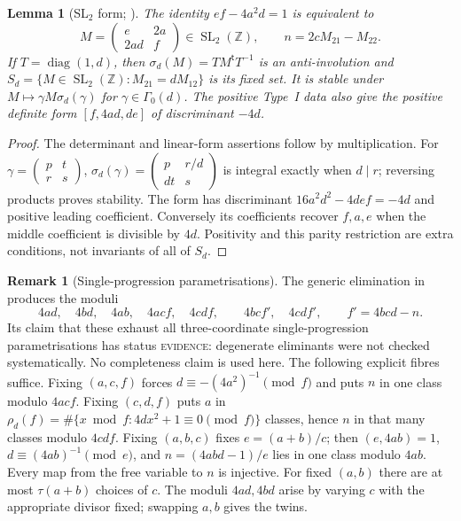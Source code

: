 \documentclass[10pt,reqno]{amsart}
\newtheorem{lemma}[theorem]{Lemma}
\theoremstyle{definition}
\newtheorem{remark}[theorem]{Remark}
\numberwithin{equation}{section}
\newcommand{\Z}{\mathbb Z}
\DeclareMathOperator{\SL}{SL}
\newcommand{\status}[1]{\textup{\textsc{#1}}}
\begin{document}
\begin{lemma}[SL$_2$ form; {\cite[Lemma~3.1]{MN3}}]\label{M:3.1}
The identity $ef-4a^2d=1$ is equivalent to
\[
 M=\begin{pmatrix}e&2a\\2ad&f\end{pmatrix}\in\SL_2(\Z),
 \qquad n=2cM_{21}-M_{22}.
\]
If $T=\operatorname{diag}(1,d)$, then
$\sigma_d(M)=TM^{\mathsf t}T^{-1}$ is an anti-involution and
$S_d=\{M\in\SL_2(\Z):M_{21}=dM_{12}\}$ is its fixed set.
It is stable under $M\mapsto\gamma M\sigma_d(\gamma)$ for
$\gamma\in\Gamma_0(d)$. The positive Type~I data also give the positive
definite form $[f,4ad,de]$ of discriminant $-4d$.
\end{lemma}
\begin{proof}
The determinant and linear-form assertions follow by multiplication.
For $\gamma=\left(\begin{smallmatrix}p&t\\r&s\end{smallmatrix}\right)$,
$\sigma_d(\gamma)=\left(\begin{smallmatrix}p&r/d\\dt&s\end{smallmatrix}\right)$
is integral exactly when $d\mid r$; reversing products proves stability.
The form has discriminant $16a^2d^2-4def=-4d$ and positive leading
coefficient. Conversely its coefficients recover $f,a,e$ when the middle
coefficient is divisible by $4d$. Positivity and this parity restriction
are extra conditions, not invariants of all of $S_d$.
\end{proof}

\begin{remark}[Single-progression parametrisations]\label{M:3.2}
The generic elimination in \cite[Lemma~3.2]{MN3} produces the moduli
\[
 4ad,\quad4bd,\quad4ab,\quad4acf,\quad4cdf,
 \qquad4bcf',\quad4cdf',\qquad f'=4bcd-n.
\]
Its claim that these exhaust all three-coordinate single-progression
parametrisations has status \status{evidence}: degenerate eliminants were
not checked systematically. No completeness claim is used here. The
following explicit fibres suffice. Fixing $(a,c,f)$ forces
$d\equiv-(4a^2)^{-1}\pmod f$ and puts $n$ in one class modulo $4acf$.
Fixing $(c,d,f)$ puts $a$ in
$\rho_d(f)=\#\{x\bmod f:4dx^2+1\equiv0\pmod f\}$ classes, hence $n$ in
that many classes modulo $4cdf$. Fixing $(a,b,c)$ fixes $e=(a+b)/c$;
then $(e,4ab)=1$, $d\equiv(4ab)^{-1}\pmod e$, and
$n=(4abd-1)/e$ lies in one class modulo $4ab$.
Every map from the free variable to $n$ is injective. For fixed $(a,b)$
there are at most $\tau(a+b)$ choices of $c$. The moduli $4ad,4bd$ arise by
varying $c$ with the appropriate divisor fixed; swapping $a,b$ gives the twins.
\end{remark}
\end{document}
